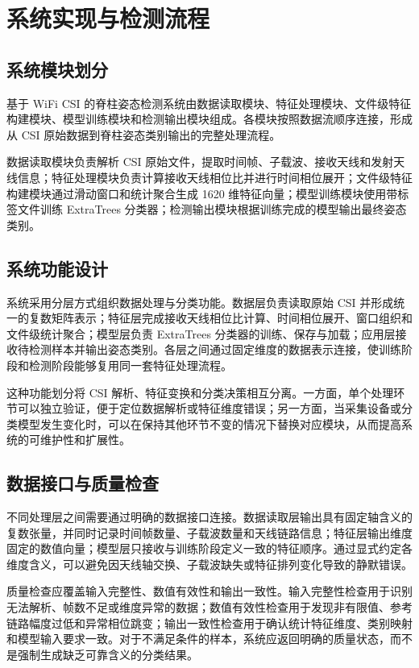﻿%

\chapter{系统实现与检测流程}
\label{chap:implementation}

\section{系统模块划分}
基于 WiFi CSI 的脊柱姿态检测系统由数据读取模块、特征处理模块、文件级特征构建模块、模型训练模块和检测输出模块组成。各模块按照数据流顺序连接，形成从 CSI 原始数据到脊柱姿态类别输出的完整处理流程。

数据读取模块负责解析 CSI 原始文件，提取时间帧、子载波、接收天线和发射天线信息；特征处理模块负责计算接收天线相位比并进行时间相位展开；文件级特征构建模块通过滑动窗口和统计聚合生成 1620 维特征向量；模型训练模块使用带标签文件训练 ExtraTrees 分类器；检测输出模块根据训练完成的模型输出最终姿态类别。

\section{系统功能设计}
系统采用分层方式组织数据处理与分类功能。数据层负责读取原始 CSI 并形成统一的复数矩阵表示；特征层完成接收天线相位比计算、时间相位展开、窗口组织和文件级统计聚合；模型层负责 ExtraTrees 分类器的训练、保存与加载；应用层接收待检测样本并输出姿态类别。各层之间通过固定维度的数据表示连接，使训练阶段和检测阶段能够复用同一套特征处理流程。

这种功能划分将 CSI 解析、特征变换和分类决策相互分离。一方面，单个处理环节可以独立验证，便于定位数据解析或特征维度错误；另一方面，当采集设备或分类模型发生变化时，可以在保持其他环节不变的情况下替换对应模块，从而提高系统的可维护性和扩展性。

\section{数据接口与质量检查}
不同处理层之间需要通过明确的数据接口连接。数据读取层输出具有固定轴含义的复数张量，并同时记录时间帧数量、子载波数量和天线链路信息；特征层输出维度固定的数值向量；模型层只接收与训练阶段定义一致的特征顺序。通过显式约定各维度含义，可以避免因天线轴交换、子载波缺失或特征排列变化导致的静默错误。

质量检查应覆盖输入完整性、数值有效性和输出一致性。输入完整性检查用于识别无法解析、帧数不足或维度异常的数据；数值有效性检查用于发现非有限值、参考链路幅度过低和异常相位跳变；输出一致性检查用于确认统计特征维度、类别映射和模型输入要求一致。对于不满足条件的样本，系统应返回明确的质量状态，而不是强制生成缺乏可靠含义的分类结果。

